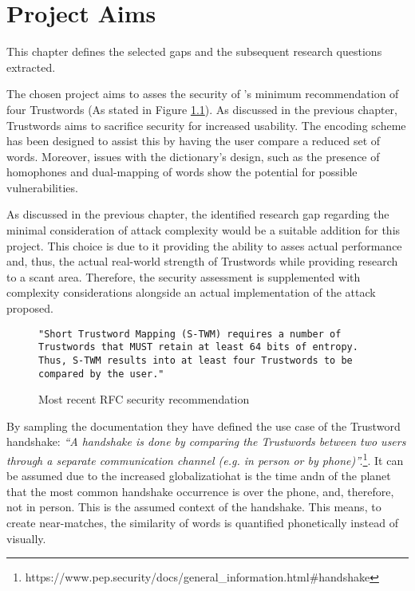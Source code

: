 \chapter{Project Aims}

This chapter defines the selected gaps and the subsequent research questions extracted.

The chosen project aims to asses the security of \pep's minimum recommendation of four Trustwords (As stated in Figure \ref{fig:trustwordsNum}). As discussed in the previous chapter, Trustwords aims to sacrifice security for increased usability. The encoding scheme has been designed to assist this by having  the user compare a reduced set of words. Moreover, issues with the dictionary's design, such as the presence of homophones and dual-mapping of words show the potential for possible vulnerabilities. 

As discussed in the previous chapter, the identified research gap regarding the minimal consideration of attack complexity would be a suitable addition for this project. This choice is due to it providing the ability to asses actual performance and, thus, the actual real-world strength of Trustwords while providing research to a scant area. Therefore, the security assessment is supplemented with complexity considerations alongside an actual implementation of the attack proposed.

\begin{center}
\begin{figure}[h!]
    \centering
        
    \begin{lstlisting}[frame=single, numbers=none]
"Short Trustword Mapping (S-TWM) requires a number of 
Trustwords that MUST retain at least 64 bits of entropy. 
Thus, S-TWM results into at least four Trustwords to be 
compared by the user."
    \end{lstlisting}

    \caption{Most recent RFC security recommendation}
    \label{fig:trustwordsNum}
\end{figure}
\end{center}
By sampling the \pep documentation they have defined the use case of the Trustword handshake: \textit{``A handshake is done by comparing the Trustwords between two users through a separate communication channel (e.g. in person or by phone)''.}\footnote{https://www.pep.security/docs/general\_information.html\#handshake}. It can be assumed due to the increased globalizatiohat is the time andn of the planet that the most common handshake occurrence is over the phone, and, therefore, not in person. This is the assumed context of the handshake. This means, to create near-matches, the similarity of words is quantified phonetically instead of visually.


